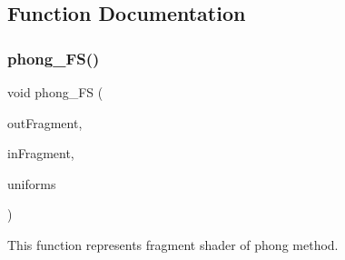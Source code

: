 \subsection{Function Documentation}
\mbox{\label{group__shader__side_gacad0f238507689fa275995e3aa67ce22}} 
\subsubsection{\texorpdfstring{phong\+\_\+\+F\+S()}{phong\_FS()}}
{\footnotesize\ttfamily void phong\+\_\+\+FS (\begin{DoxyParamCaption}\item[{\hyperlink{structOutFragment}{Out\+Fragment} \&}]{out\+Fragment,  }\item[{\hyperlink{structInFragment}{In\+Fragment} const \&}]{in\+Fragment,  }\item[{\hyperlink{structUniforms}{Uniforms} const \&}]{uniforms }\end{DoxyParamCaption})}



This function represents fragment shader of phong method. 


